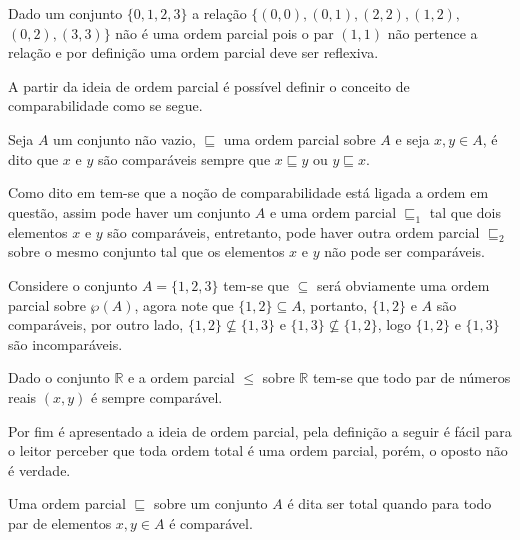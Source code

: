 \begin{exemplo}
	Dado um conjunto $\{0, 1, 2, 3\}$ a relação $\{(0, 0), (0, 1), (2, 2), (1, 2),$ $(0, 2), (3, 3)\}$ não é uma ordem parcial pois o par $(1, 1)$ não pertence a relação e por definição uma ordem parcial deve ser reflexiva.
\end{exemplo}

A partir da ideia de ordem parcial é possível definir o conceito de comparabilidade como se segue.

\begin{definicao}[Comparabilidade]\label{def:Comparabilidade}
	Seja $A$ um conjunto não vazio, $\sqsubseteq$ uma ordem parcial sobre $A$ e seja $x, y \in A$, é dito que $x$ e $y$ são comparáveis sempre que $x \sqsubseteq y$ ou $y \sqsubseteq x$.
\end{definicao}

Como dito em \cite{abe1991-TC, carmo2013} tem-se que a noção de comparabilidade está ligada a ordem em questão, assim pode haver um conjunto $A$ e uma ordem parcial $\sqsubseteq_1$ tal que dois elementos $x$ e $y$ são comparáveis, entretanto, pode haver outra ordem parcial $\sqsubseteq_2$ sobre o mesmo conjunto tal que os elementos $x$ e $y$ não pode ser comparáveis.

\begin{exemplo}
	Considere o conjunto $A = \{1, 2, 3\}$ tem-se que $\subseteq$ será obviamente uma ordem parcial sobre $\wp(A)$, agora note que $\{1, 2\} \subseteq A$, portanto, $\{1, 2\}$ e $A$ são comparáveis, por outro lado, $\{1, 2\} \not\subseteq \{1, 3\}$ e $\{1, 3\} \not\subseteq \{1, 2\}$, logo $\{1, 2\}$ e $\{1, 3\}$ são incomparáveis.
\end{exemplo}

\begin{exemplo}
  Dado o conjunto $\mathbb{R}$ e a ordem parcial $\leq$ sobre $\mathbb{R}$ tem-se que todo par de números reais $(x, y)$ é sempre comparável.
\end{exemplo}

Por fim é apresentado a ideia de ordem parcial, pela definição a seguir é fácil para o leitor perceber que toda ordem total é uma ordem parcial, porém, o oposto não é verdade.

\begin{definicao}
	Uma ordem parcial $\sqsubseteq$ sobre um conjunto $A$ é dita ser total quando para todo par de elementos $x, y \in A$ é comparável.
\end{definicao}

